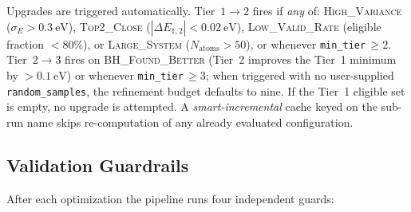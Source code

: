 Upgrades are triggered automatically. Tier~$1{\to}2$ fires if
\emph{any} of:
\textsc{High\_Variance} ($\sigma_{E} > \SI{0.3}{\eV}$),
\textsc{Top2\_Close} ($|\Delta E_{1,2}| < \SI{0.02}{\eV}$),
\textsc{Low\_Valid\_Rate} (eligible fraction $< 80\%$), or
\textsc{Large\_System} ($N_{\text{atoms}} > 50$), or whenever
\texttt{min\_tier}$\,\ge 2$. Tier~$2{\to}3$ fires on
\textsc{BH\_Found\_Better} (Tier~2 improves the Tier~1 minimum by
$> \SI{0.1}{\eV}$) or whenever \texttt{min\_tier}$\,\ge 3$; when
triggered with no user-supplied \texttt{random\_samples}, the
refinement budget defaults to nine. If the Tier~1 eligible set is
empty, no upgrade is attempted. A \emph{smart-incremental} cache
keyed on the sub-run name skips re-computation of any already
evaluated configuration.

\subsection{Validation Guardrails}
\label{sec:guards}

After each optimization the pipeline runs four independent guards:


